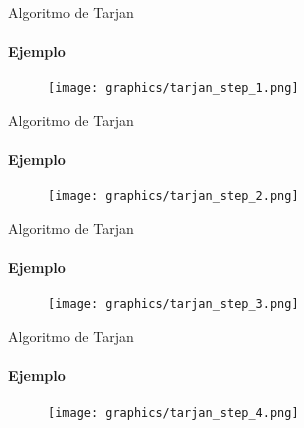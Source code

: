 \begin{frame}{Algoritmo de Tarjan}
    \framesubtitle{Ejemplo}
    \begin{figure}
        \texttt{[image: graphics/tarjan\_step\_1.png]}
    \end{figure}
\end{frame}

\begin{frame}{Algoritmo de Tarjan}
    \framesubtitle{Ejemplo}
    \begin{figure}
        \texttt{[image: graphics/tarjan\_step\_2.png]}
    \end{figure}
\end{frame}

\begin{frame}{Algoritmo de Tarjan}
    \framesubtitle{Ejemplo}
    \begin{figure}
        \texttt{[image: graphics/tarjan\_step\_3.png]}
    \end{figure}
\end{frame}

\begin{frame}{Algoritmo de Tarjan}
    \framesubtitle{Ejemplo}
    \begin{figure}
        \texttt{[image: graphics/tarjan\_step\_4.png]}
    \end{figure}
\end{frame}

